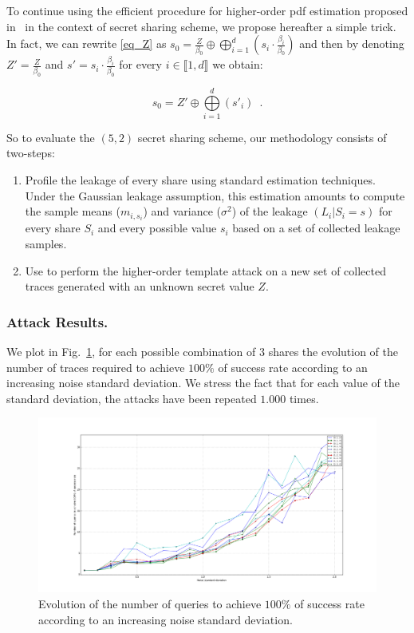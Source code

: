 \documentclass{llncs}
\begin{document}
To continue using the efficient procedure for higher-order pdf estimation proposed in~\cite{LPRRT14} in the context of secret sharing scheme, we propose hereafter a simple trick. In fact, we can rewrite \eqref{eq_Z} as $s_0=\frac{Z}{\beta_0}\oplus\bigoplus\limits_{i=1}^{d} (s_i \cdot \frac{\beta_i}{\beta_0})$ and then by denoting $Z'=\frac{Z}{\beta_0}$ and $s'=s_i \cdot \frac{\beta_i}{\beta_0}$ for every $i \in \llbracket 1, d\rrbracket$ we obtain:

\begin{equation*}
s_0= Z' \oplus \bigoplus\limits_{i=1}^{d} (s'_i) \enspace.
\end{equation*}

So to evaluate the $(5,2)$ secret sharing scheme, our methodology consists of two-steps:

\begin{enumerate}
\item Profile the leakage of every share using standard estimation techniques. Under the Gaussian leakage assumption, this estimation amounts to compute the sample means ($m_{i,s_i}$) and variance ($\sigma^2$) of the leakage $(L_i | S_i = s)$ for every share $S_i$ and every possible value $s_i$ based on a set of collected leakage samples.
\item Use \label{eq_pdf} to perform the higher-order template attack on a new set of collected traces generated with an unknown secret value $Z$.
\end{enumerate} 

\subsubsection{Attack Results.} 

We plot in Fig.~\ref{fig_3_shares}, for each possible combination of $3$ shares the evolution of the number of traces required to achieve $100\%$ of success rate according to an increasing noise standard deviation. We stress the fact that for each value of the standard deviation, the attacks have been repeated $1.000$ times.  

\begin{figure}
\begin{center}
\includegraphics[width=1\textwidth]{Figure/res_125_246_119_104_150.png}
\caption{Evolution of the number of queries to achieve $100\%$ of success rate according to an increasing noise standard deviation.}
\label{fig_3_shares}
\end{center}
\end{figure}
\end{document}
